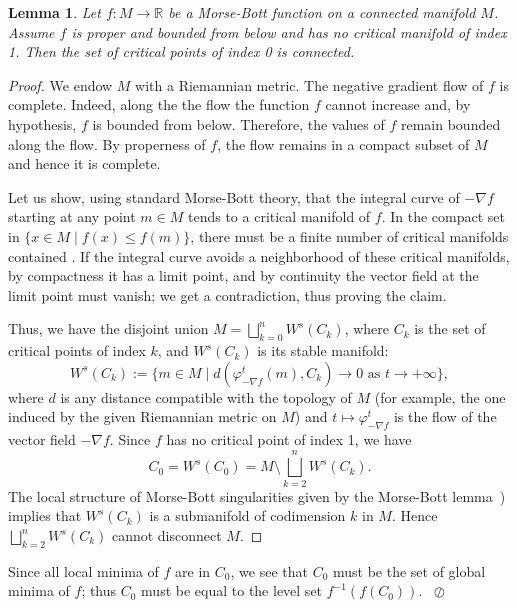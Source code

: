 \documentclass[11pt]{article}
\newtheorem{lemma}[theorem]{Lemma}
\newcommand{\phy}{\varphi}
\newenvironment{remark}{\refstepcounter{theorem}\par\medskip\noindent{\bf
Remark~\thetheorem~~}}{\unskip\nobreak\hfill\hbox{ $\oslash$}\par\bigskip}
\newcommand{\fleche}{\rightarrow}
\newcommand{\RM}{\mathbb{R}}
\renewcommand{\leq}{\leqslant}
\begin{document}
\begin{lemma}
  \label{lemm:semibounded}
  Let $f:M\fleche\RM$ be a Morse-Bott function on a connected manifold
  $M$. Assume $f$ is proper and bounded from below and has no critical
  manifold of index 1. Then the set of critical points of index 0 is
  connected.
\end{lemma}

\begin{proof}
  We endow $M$ with a Riemannian metric.  The negative gradient flow
  of $f$ is complete. Indeed, along the the flow the function $f$
  cannot increase and, by hypothesis, $f$ is bounded from
  below. Therefore, the values of $f$ remain bounded along the
  flow. By properness of $f$, the flow remains in a compact subset of
  $M$ and hence it is complete.

  Let us show, using standard Morse-Bott theory, that the integral
  curve of $- \nabla f$ starting at any point $m\in M$ tends to a
  critical manifold of $f$. In the compact set in $\{x \in M \mid
  f(x)\leq f(m)\}$, there must be a finite number of critical
  manifolds contained . If the integral curve avoids a neighborhood of
  these critical manifolds, by compactness it has a limit point, and
  by continuity the vector field at the limit point must vanish; we
  get a contradiction, thus proving the claim.

  Thus, we have the disjoint union $M = \bigsqcup_{k=0}^n W^s(C_k)$,
  where $C_k$ is the set of critical points of index $k$, and
  $W^s(C_k)$ is its stable manifold:
  \[
  W^s(C_k) := \{m\in M\mid d(\phy_{-\nabla f}^t(m),C_k)\fleche 0
  \text{ as } t\fleche+\infty\},
  \]
  where $d$ is any distance compatible with the topology of $M$ (for
  example, the one induced by the given Riemannian metric on $M$) and
  $t \mapsto \phy_{-\nabla f}^t$ is the flow of the vector field $-
  \nabla f$. Since $f$ has no critical point of index 1, we have
  \[
  C_0 = W^s(C_0) = M \setminus \bigsqcup_{k=2}^n W^s(C_k).
  \]
  The local structure of Morse-Bott singularities given by the
  Morse-Bott lemma~\cite{Bott,Banyaga}) implies that $W^s(C_k)$ is a
  submanifold of codimension $k$ in $M$.  Hence $\bigsqcup_{k=2}^n
  W^s(C_k)$ cannot disconnect $M$.
\end{proof}

\begin{remark}
  Since all local minima of $f$ are in $C_0$, we see that $C_0$ must
  be the set of global minima of $f$; thus $C_0$ must be equal to the
  level set $f^{-1}(f(C_0))$.
\end{remark}
\end{document}
